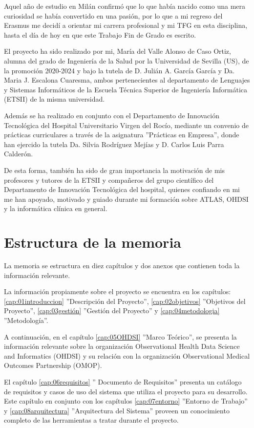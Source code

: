 Aquel año de estudio en Milán confirmó que lo que había nacido como una mera curiosidad se había convertido en una pasión, por lo que a mi regreso del Erasmus me decidí a orientar mi carrera profesional y mi TFG en esta disciplina, hasta el día de hoy en que este Trabajo Fin de Grado es escrito.

El proyecto ha sido realizado por mi, María del Valle Alonso de Caso Ortiz, alumna del grado de Ingeniería de la Salud por la Universidad de Sevilla (US), de la promoción 2020-2024 y bajo la tutela de D. Julián A. García García y Da. Maria J. Escalona Cuaresma, ambos pertenecientes al departamento de Lenguajes y Sistemas Informáticos de la Escuela Técnica Superior de Ingeniería Informática (ETSII) de la misma universidad. 

Además se ha realizado en conjunto con el Departamento de Innovación Tecnológica del Hospital Universitario Virgen del Rocío, mediante un convenio de prácticas curriculares a través de la asignatura ''Prácticas en Empresa'', donde han ejercido la tutela Da. Silvia Rodríguez Mejías y D. Carlos Luis Parra Calderón. 

De esta forma, también ha sido de gran importancia la motivación de mis profesores y tutores de la ETSII y compañeros del grupo científico del Departamento de Innovación Tecnológica del hospital, quienes confiando en mi me han apoyado, motivado y guiado durante mi formación sobre ATLAS, OHDSI y la informática clínica en general.

\section{Estructura de la memoria} \label{sec:01estructura}

La memoria se estructura en diez capítulos y dos anexos que contienen toda la información relevante.

La información propiamente sobre el proyecto se encuentra en los capítulos: \ref{cap:01introduccion} ''Descripción del Proyecto'',  \ref{cap:02objetivos} ''Objetivos del Proyecto'', \ref{cap:03gestión} ''Gestión del Proyecto'' y \ref{cap:04metodologia} ''Metodología''.

A continuación, en el capítulo \ref{cap:05OHDSI} ''Marco Teórico'', se presenta la información relevante sobre la organización Observational Health Data Science and Informatics (OHDSI) y su relación con la organización Observational Medical Outcomes Partnership (OMOP).

El capítulo \ref{cap:06requisitos} '' Documento de Requisitos'' presenta un catálogo de requisitos y casos de uso del sistema que utiliza el proyecto para su desarrollo. Este capítulo en conjunto con los capítulos \ref{cap:07entorno} ''Entorno de Trabajo'' y \ref{cap:08arquitectura} ''Arquitectura del Sistema'' proveen un conocimiento completo de las herramientas a tratar durante el proyecto. 

